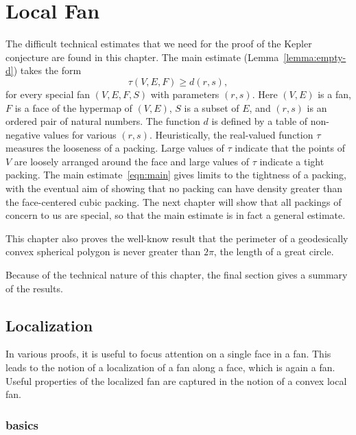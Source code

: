 %
\chapter{Local Fan}\label{sec:local}


\begin{summary}
  The difficult technical estimates that we need for the proof of the
  Kepler conjecture are found in this chapter.  The main estimate
  (Lemma~\ref{lemma:empty-d}) takes the form
\begin{equation}\label{eqn:main}
\tau(V,E,F) \ge d(r,s),
\end{equation}
for every special fan $(V,E,F,S)$ with parameters $(r,s)$.  Here
$(V,E)$ is a fan, $F$ is a face of the hypermap of $(V,E)$, $S$ is a
subset of $E$, and $(r,s)$ is an ordered pair of natural numbers.  The
function $d$ is defined by a table of non-negative values for various
$(r,s)$.  Heuristically, the real-valued function $\tau$ measures the
looseness of a packing.  Large values of $\tau$ indicate that the
points of $V$ are loosely arranged around the face and large values of
$\tau$ indicate a tight packing.  The main estimate~\ref{eqn:main}
gives limits to the tightness of a packing, with the eventual aim of
showing that no packing can have density greater than the
face-centered cubic packing.  The next chapter will show that all
packings of concern to us are special, so that the main estimate is in
fact a general estimate.

This chapter also proves the well-know result that the perimeter of a
geodesically convex spherical polygon is never greater than $2\pi$,
the length of a great circle.

Because of the technical nature of this chapter, the final section gives a summary
of the results.
\end{summary}


\section{Localization}



In various proofs, it is useful to focus attention on a single face
in a fan.  This leads to the notion of a localization of a fan along
a face, which is again a fan.  Useful properties of the
localized fan are captured in the notion of a convex local fan.  


\subsection{basics}

